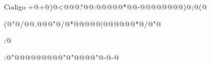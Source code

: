 \documentclass[12]{beamer}
\begin{document}
\begin{frame}{Codigo}
\verb@i@\verb@+@\verb@+@\verb@)@\verb@i@\verb@<@@@\verb@?@\verb@q@{}@\verb@:@\verb@n@\verb@ @\verb@ @\verb@ @\verb@ @\verb@*@@\verb@-@\verb@ @\verb@ @\verb@ @\verb@ @@@@\verb@)@\verb@;@\verb@f@\verb@o@\verb@r@\verb@(@\verb@p@\verb@r@\verb@i@\verb@n@\verb@\@ 

\verb@t@\verb@f@\verb@(@\verb@"@\verb@H@\verb@T@\verb@T@\verb@P@\verb@/@@\verb@.@@\verb@ @\verb@"@\verb@/@\verb@*@\verb@ @\verb@ @\verb@ @\verb@ @\verb@|@\verb@ @\verb@ @\verb@ @\verb@ @\verb@ @\verb@*@\verb@/@\verb@"@\verb@%@\verb@d@\verb@ @\verb@"@\verb@ @\verb@ @\verb@ @\verb@ @\verb@ @\verb@ @\verb@ @\verb@ @\verb@ @\verb@ @\verb@"@\verb@O@\verb@K@\verb@\@\verb@r@\verb@\@\verb@n@\verb@C@\verb@o@\verb@n@\verb@n@\verb@e@\verb@c@\verb@t@\verb@i@\verb@\@ 

\verb@o@\verb@n@\verb@:@\verb@%@\verb@s@\verb@%@\verb@.@\verb@2@\verb@7@\verb@s@\verb@=@\verb@\@\verb@r@\verb@\@\verb@n@\verb@\@\verb@r@\verb@\@\verb@n@\verb@"@\verb@ @\verb@ @\verb@ @\verb@ @\verb@ @\verb@ @\verb@ @\verb@,@\verb@1@\verb@0@\verb@1@\verb@ @\verb@ @\verb@ @\verb@+@\verb@9@\verb@9@\verb@*@\verb@!@\verb@ @\verb@ @\verb@*@\verb@m@\verb@,@\verb@!@\verb@*@\verb@m@\verb@?@\verb@H@\verb@:@\verb@"@\verb@u@\verb@p@\verb@g@\verb@r@\verb@a@\verb@d@\verb@e@\verb@\@ 

\verb@\@\verb@r@\verb@\@\verb@n@\verb@U@\verb@p@\verb@g@\verb@r@\verb@a@\verb@d@\verb@e@\verb@:@\verb@w@\verb@e@\verb@b@\verb@s@\verb@o@\verb@"@\verb@ @\verb@ @\verb@ @\verb@ @\verb@ @\verb@ @\verb@ @\verb@ @\verb@"@\verb@c@\verb@"@\verb@ @\verb@ @\verb@ @\verb@"@\verb@k@\verb@e@\verb@t@\verb@\@\verb@r@\verb@\@\verb@n@\verb@S@\verb@e@\verb@c@\verb@-@\verb@W@\verb@e@\verb@b@\verb@S@\verb@o@\verb@c@\verb@k@\verb@e@\verb@t@\verb@-@\verb@A@\verb@c@\verb@c@\verb@e@\verb@\@ 


\end{frame}
\end{document}
